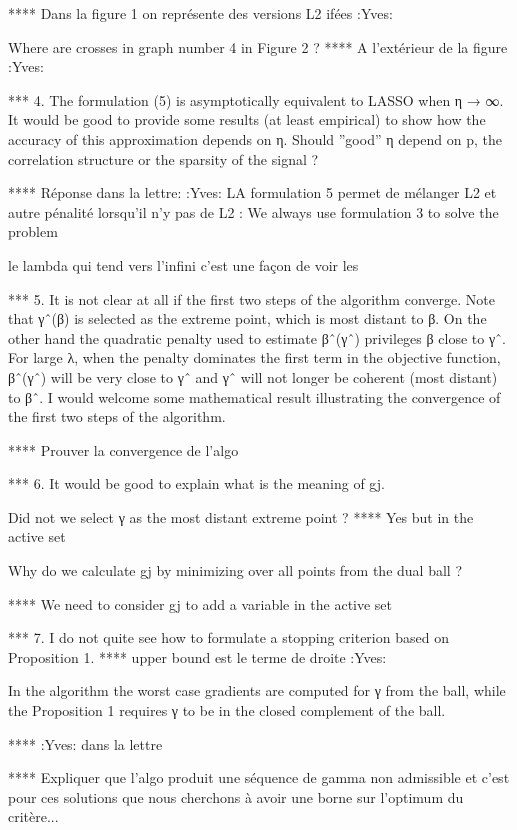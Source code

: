 \documentclass[a4paper,11pt]{texMemo}
\begin{document}
**** Dans la figure 1 on représente des versions L2 ifées :Yves:

 Where are crosses in graph number 4 in Figure 2 ?
**** A l'extérieur de la figure :Yves:

*** 4. The formulation (5) is asymptotically equivalent to LASSO when η → ∞. 
It would be good to provide some results (at least empirical) 
to show how the accuracy of this approximation depends on η.
Should ”good” η depend on p, the correlation structure or the sparsity of the signal ?

****  Réponse dans la lettre:  :Yves:
LA formulation 5 permet de mélanger L2 et autre pénalité lorsqu'il n'y pas de L2 : 
We always use formulation 3 to solve the problem


le lambda qui tend vers l'infini c'est une façon de voir les


*** 5. It is not clear at all if the first two steps of the algorithm converge. 
Note that γˆ(β) is selected as the extreme point, which is most distant to β. 
On the other hand the quadratic penalty used to estimate βˆ(γˆ) privileges β close to γˆ. 
For large λ, when the penalty dominates the first term in the objective function, 
βˆ(γˆ) will be very close to γˆ and γˆ will not longer be coherent (most distant) to βˆ.
I would welcome some mathematical result illustrating the convergence of the first two steps of the algorithm.


**** Prouver la convergence de l'algo

*** 6. It would be good to explain what is the meaning of gj. 

Did not we select γ as the most distant extreme point ?
**** Yes but  in the active set

Why do we calculate gj by minimizing over all points from the dual ball ?

**** We need to consider gj to add a variable in the active set

*** 7. I do not quite see how to formulate a stopping criterion based on Proposition 1. 
**** upper bound est le terme de droite :Yves:


In the algorithm the worst case gradients are computed for γ from the ball,
 while the Proposition 1 requires γ to be in the closed complement of the ball.

**** :Yves: dans la lettre

**** Expliquer que l'algo produit une séquence de gamma non admissible et c'est pour ces solutions 
que nous cherchons à avoir une borne sur l'optimum du critère...
\end{document}

